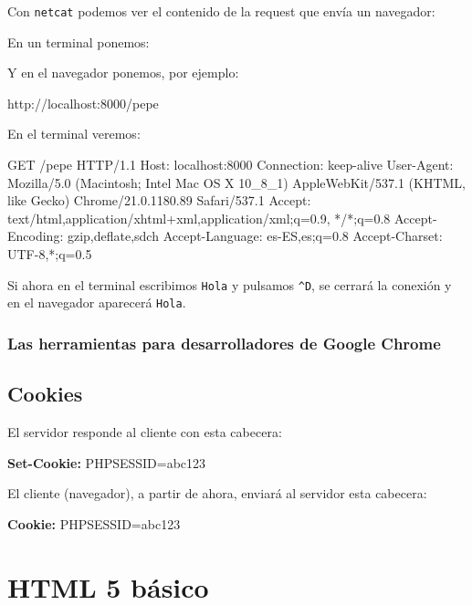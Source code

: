 \documentclass[a4paper,11pt]{memoir}
\begin{document}
Con \texttt{netcat} podemos ver el contenido de la request que envía
un navegador:

En un terminal ponemos:


Y en el navegador ponemos, por ejemplo:

\begin{codigo}
http://localhost:8000/pepe
\end{codigo}

En el terminal veremos:

\begin{codigo}
GET /pepe HTTP/1.1
Host: localhost:8000
Connection: keep-alive
User-Agent: Mozilla/5.0 (Macintosh; Intel Mac OS X 10\_8\_1)
    AppleWebKit/537.1 (KHTML, like Gecko)
    Chrome/21.0.1180.89 Safari/537.1
Accept: text/html,application/xhtml+xml,application/xml;q=0.9,
    */*;q=0.8
Accept-Encoding: gzip,deflate,sdch
Accept-Language: es-ES,es;q=0.8
Accept-Charset: UTF-8,{*};q=0.5
\end{codigo}

Si ahora en el terminal escribimos \texttt{Hola} y pulsamos \texttt{\textasciicircum{}D},
se cerrará la conexión y en el navegador aparecerá \texttt{Hola}.


\subsection{Las herramientas para desarrolladores de Google Chrome}


\section{Cookies}

El servidor responde al cliente con esta cabecera:

\begin{codigo}
\textbf{Set-Cookie:} PHPSESSID=abc123
\end{codigo}

El cliente (navegador), a partir de ahora, enviará al servidor esta
cabecera:

\begin{codigo}
\textbf{Cookie:} PHPSESSID=abc123
\end{codigo}

\chapter{HTML 5 básico}
\end{document}
